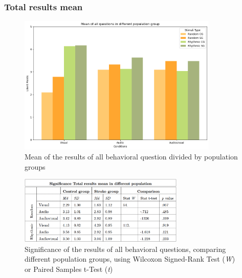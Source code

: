 \subsubsection*{Total results mean}
\begin{figure}[H]
    \centering
    \includegraphics[width=0.85\textwidth]{bar_plots/mean stroke and control.png}
    \caption{Mean of the results of all behavioral question divided by population groups}
    \label{fig: mean_population_condition} 
\end{figure} 
\begin{figure}[H]
    \centering
    \includegraphics[width=0.70\textwidth]{significance_tables/tot_mean_pop.png}
    \caption{Significance of the results of all behavioral questions, comparing different population groups, using Wilcoxon Signed-Rank Test (\textit{W}) or Paired Samples t-Test (\textit{t})}
    \label{fig: significance_total_mean_pop} 
\end{figure} 


